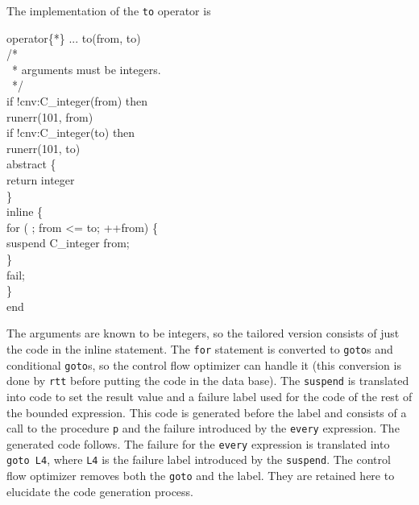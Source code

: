 \noindent
The implementation of the \texttt{to} operator is 

\goodbreak
\begin{iconcode}
\>operator\{*\} ... to(from, to)\\
\>\>/*\\
\>\>\ * arguments must be integers.\\
\>\>\ */\\
\>\>if !cnv:C\_integer(from) then\\
\>\>\>runerr(101, from)\\
\>\>if !cnv:C\_integer(to) then\\
\>\>\>runerr(101, to)\\
\>\>abstract \{\\
\>\>\>return integer\\
\>\>\>\}\\
\>\>inline \{\\
\>\>\>for ( ; from <= to; ++from) \{\\
\>\>\>\>suspend C\_integer from;\\
\>\>\>\>\}\\
\>\>\>fail;\\
\>\>\>\}\\
\>end\\
\end{iconcode}

\noindent
The arguments are known to be integers, so the tailored version
consists of just the code in the inline statement. The \texttt{for}
statement is converted to \texttt{goto}s and conditional
\texttt{goto}s, so the control flow optimizer can handle it (this
conversion is done by \texttt{rtt} before putting the code in the data
base). The \texttt{suspend} is translated into code to set the result
value and a failure label used for the code of the rest of the bounded
expression. This code is generated before the label and consists of a
call to the procedure \texttt{p} and the failure introduced by the
\texttt{every} expression. The generated code follows. The failure for
the \texttt{every} expression is translated into \texttt{goto L4},
where \texttt{L4} is the failure label introduced by the
\texttt{suspend}. The control flow optimizer removes both the
\texttt{goto} and the label. They are retained here to elucidate the
code generation process.

